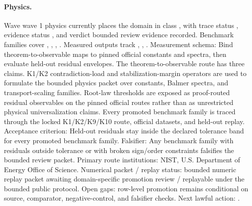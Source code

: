 \paragraph{Physics.}
Wave wave 1 physics currently places the domain in class , with trace status , evidence status , and verdict bounded review evidence recorded.
Benchmark families cover , \allowbreak {}, \allowbreak {}, \allowbreak {}.
Measured outputs track , \allowbreak {}, \allowbreak {}.
Measurement schema: Bind theorem-to-observable maps to pinned official constants and spectra, then evaluate held-out residual envelopes.
The theorem-to-observable route has three claims. K1/K2 contradiction-load and stabilization-margin operators are used to formulate the bounded physics packet over constants, Balmer spectra, and transport-scaling families. Root-law thresholds are exposed as proof-routed residual observables on the pinned official routes rather than as unrestricted physical universalization claims. Every promoted benchmark family is traced through the locked K1/K2/K9/K10 route, official datasets, and held-out replay.
Acceptance criterion: Held-out residuals stay inside the declared tolerance band for every promoted benchmark family.
Falsifier: Any benchmark family with residuals outside tolerance or with broken sign/order constraints falsifies the bounded review packet.
Primary route institutions: NIST, \allowbreak U.S. Department of Energy Office of Science.
Numerical packet / replay status: bounded numeric replay packet awaiting domain-specific promotion review / replayable under the bounded public protocol.
Open gaps: row-level promotion remains conditional on source, comparator, negative-control, and falsifier checks.
Next lawful action: .

